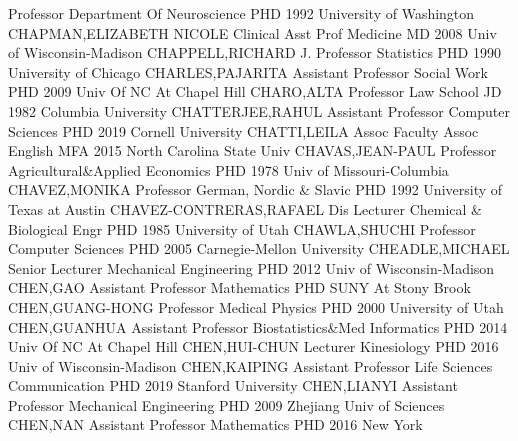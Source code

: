 \documentclass[
]{article}
\begin{document}
\textbar Professor \textbar Department Of Neuroscience \textbar{}
 \textbar PHD 1992 University of Washington
\textbar CHAPMAN,ELIZABETH NICOLE \textbar Clinical Asst Prof
\textbar Medicine \textbar{}  \textbar MD 2008 Univ of
Wisconsin-Madison \textbar CHAPPELL,RICHARD J. \textbar Professor
\textbar Statistics \textbar{}  \textbar PHD 1990 University
of Chicago \textbar CHARLES,PAJARITA \textbar Assistant Professor
\textbar Social Work \textbar{}  \textbar PHD 2009 Univ Of NC
At Chapel Hill \textbar CHARO,ALTA \textbar Professor \textbar Law
School \textbar{}  \textbar JD 1982 Columbia University
\textbar CHATTERJEE,RAHUL \textbar Assistant Professor \textbar Computer
Sciences \textbar{}  \textbar PHD 2019 Cornell University
\textbar CHATTI,LEILA \textbar Assoc Faculty Assoc \textbar English
\textbar{}  \textbar MFA 2015 North Carolina State Univ
\textbar CHAVAS,JEAN-PAUL \textbar Professor
\textbar Agricultural\&Applied Economics \textbar{} 
\textbar PHD 1978 Univ of Missouri-Columbia \textbar CHAVEZ,MONIKA
\textbar Professor \textbar German, Nordic \& Slavic \textbar{}
 \textbar PHD 1992 University of Texas at Austin
\textbar CHAVEZ-CONTRERAS,RAFAEL \textbar Dis Lecturer \textbar Chemical
\& Biological Engr \textbar{}  \textbar PHD 1985 University
of Utah \textbar CHAWLA,SHUCHI \textbar Professor \textbar Computer
Sciences \textbar{}  \textbar PHD 2005 Carnegie-Mellon
University \textbar CHEADLE,MICHAEL \textbar Senior Lecturer
\textbar Mechanical Engineering \textbar{}  \textbar PHD 2012
Univ of Wisconsin-Madison \textbar CHEN,GAO \textbar Assistant Professor
\textbar Mathematics \textbar{}  \textbar PHD SUNY At Stony
Brook \textbar CHEN,GUANG-HONG \textbar Professor \textbar Medical
Physics \textbar{}  \textbar PHD 2000 University of Utah
\textbar CHEN,GUANHUA \textbar Assistant Professor
\textbar Biostatistics\&Med Informatics \textbar{} 
\textbar PHD 2014 Univ Of NC At Chapel Hill \textbar CHEN,HUI-CHUN
\textbar Lecturer \textbar Kinesiology \textbar{} 
\textbar PHD 2016 Univ of Wisconsin-Madison \textbar CHEN,KAIPING
\textbar Assistant Professor \textbar Life Sciences Communication
\textbar{}  \textbar PHD 2019 Stanford University
\textbar CHEN,LIANYI \textbar Assistant Professor \textbar Mechanical
Engineering \textbar{}  \textbar PHD 2009 Zhejiang Univ of
Sciences \textbar CHEN,NAN \textbar Assistant Professor
\textbar Mathematics \textbar{}  \textbar PHD 2016 New York
\end{document}
